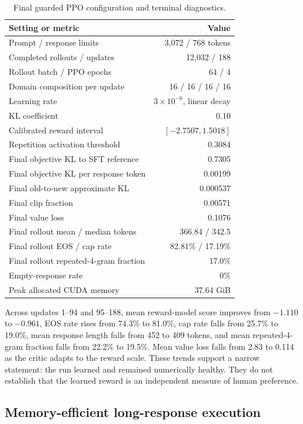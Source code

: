 \documentclass[11pt]{article}
\begin{document}
\begin{table}[H]
\centering
\caption{Final guarded PPO configuration and terminal diagnostics.}
\label{tab:ppo-final}
\begin{tabularx}{0.94\textwidth}{@{}Y r@{}}
\toprule
\textbf{Setting or metric} & \textbf{Value}\\
\midrule
Prompt / response limits & 3,072 / 768 tokens\\
Completed rollouts / updates & 12,032 / 188\\
Rollout batch / PPO epochs & 64 / 4\\
Domain composition per update & 16 / 16 / 16 / 16\\
Learning rate & $3\times10^{-6}$, linear decay\\
KL coefficient & 0.10\\
Calibrated reward interval & $[-2.7507,1.5018]$\\
Repetition activation threshold & 0.3084\\
Final objective KL to SFT reference & 0.7305\\
Final objective KL per response token & 0.00199\\
Final old-to-new approximate KL & 0.000537\\
Final clip fraction & 0.00571\\
Final value loss & 0.1076\\
Final rollout mean / median tokens & 366.84 / 342.5\\
Final rollout EOS / cap rate & 82.81\% / 17.19\%\\
Final rollout repeated-4-gram fraction & 17.0\%\\
Empty-response rate & 0\%\\
Peak allocated CUDA memory & 37.64 GiB\\
\bottomrule
\end{tabularx}
\end{table}

Across updates 1--94 and 95--188, mean reward-model score improves from
$-1.110$ to $-0.961$, EOS rate rises from 74.3\% to 81.0\%, cap rate falls
from 25.7\% to 19.0\%, mean response length falls from 452 to 409 tokens, and
mean repeated-4-gram fraction falls from 22.2\% to 19.5\%. Mean value loss
falls from 2.83 to 0.114 as the critic adapts to the reward scale. These trends
support a narrow statement: the run learned and remained numerically healthy.
They do not establish that the learned reward is an independent measure of
human preference.

\subsection{Memory-efficient long-response execution}
\end{document}
